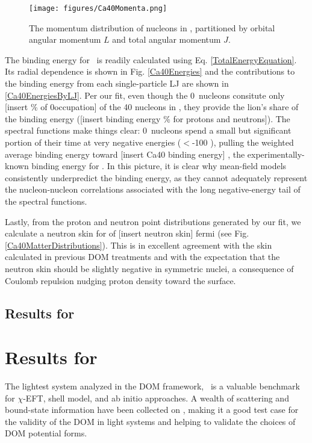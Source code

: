 \begin{figure}[tb]
    \centering
    \texttt{[image: figures/Ca40Momenta.png]}
    \caption[The single-particle momentum distributions in \caForty]
    {
        The momentum distribution of nucleons in \caForty, partitioned
        by orbital angular momentum $L$ and total angular momentum $J$.
    }
    \label{Ca40Momenta}
\end{figure}

The binding energy for \caForty\ is readily calculated using Eq.
\ref{TotalEnergyEquation}. Its radial dependence is shown in Fig. \ref{Ca40Energies} and the
contributions to the binding energy from each single-particle LJ are shown in
\ref{Ca40EnergiesByLJ}. Per our fit, even though the 0\sOne\ nucleons consitute only [insert \%
of 0\sOne occupation] of the 40 nucleons in \caForty, they provide the lion's share of the binding
energy ([insert binding energy \% for protons and neutrons]). The spectral
functions make things clear: 0\sOne\ nucleons spend a small but significant portion of their time 
at very negative energies ($<$-100 \mega\electronvolt), pulling the weighted average binding energy toward
[insert Ca40 binding energy] \mega\electronvolt{}, the experimentally-known binding energy for \caForty. In this
picture, it is clear why mean-field models consistently underpredict the binding energy, as they
cannot adequately represent the nucleon-nucleon correlations associated with the long
negative-energy tail of the spectral functions.

Lastly, from the proton and neutron point distributions generated by our fit, we calculate a
\caForty neutron skin for of [insert neutron skin] fermi (see Fig. \ref{Ca40MatterDistributions}). 
This is in excellent agreement with the skin calculated in previous DOM treatments
\cite{MahzoonPhDThesis} and with the expectation that the neutron skin should be slightly negative in
symmetric nuclei, a consequence of Coulomb repulsion nudging proton density toward the surface.

\subsection{Results for \caEight}

\section{Results for \oSixEight}
The lightest system analyzed in the DOM framework, \oSix\ is a valuable benchmark
for $\chi$-EFT, shell model, and ab initio approaches. A wealth of scattering and
bound-state information have been collected on \oSix, making it a good test case for the validity
of the DOM in light systems and helping to validate the choices of DOM potential forms.

